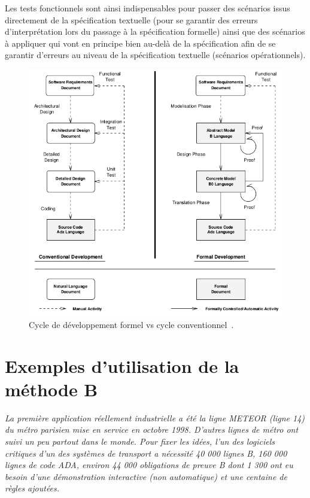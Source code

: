 \documentclass[10pt,a4paper]{article}
\begin{document}
{Les tests fonctionnels sont ainsi indispensables pour passer des scénarios issus directement de la spécification textuelle (pour se garantir des erreurs d'interprétation lors du passage à la spécification formelle) ainsi que des scénarios à appliquer qui vont en principe bien au-delà de la spécification afin de se garantir d'erreurs au niveau de la spécification textuelle (scénarios opérationnels).

\begin{figure}[h]
\centering
\includegraphics[scale=0.70]{ressources/formal_dev.png}
\caption{\label{DifferentsCycles}
Cycle de développement formel vs cycle conventionnel~\cite[page 374]{behm1999meteor}.}
\end{figure}

\section{Exemples d'utilisation de la méthode B}

\emph{La première application réellement industrielle a été la ligne METEOR (ligne 14) du métro parisien mise en service en octobre 1998. D'autres lignes de métro ont suivi un peu partout dans le monde. Pour fixer les idées, l'un des logiciels critiques d'un des systèmes de transport a nécessité 40 000 lignes B, 160 000 lignes de code ADA, environ 44 000 obligations de preuve B dont 1 300 ont eu besoin d'une démonstration interactive (non automatique) et une centaine de règles ajoutées.}\cite{dossierTechnique}

}
\end{document}
